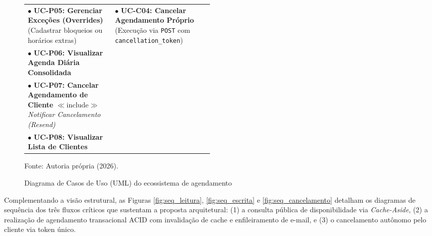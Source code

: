 \documentclass[12pt,a4paper]{article}
\begin{document}
\begin{figure}[hbt]
{\begin{minipage}{0.94\textwidth}
\begin{tabularx}{\linewidth}{@{}p{0.47\linewidth}|X@{}}
$\bullet$ \textbf{UC-P05: Gerenciar Exceções (Overrides)} \newline \hspace*{0.3cm} (Cadastrar bloqueios ou horários extras) & $\bullet$ \textbf{UC-C04: Cancelar Agendamento Próprio} \newline \hspace*{0.3cm} (Execução via \texttt{POST} com \texttt{cancellation\_token}) \\
$\bullet$ \textbf{UC-P06: Visualizar Agenda Diária Consolidada} & \\
$\bullet$ \textbf{UC-P07: Cancelar Agendamento de Cliente} \newline \hspace*{0.3cm} $\ll\text{include}\gg$ \textit{Notificar Cancelamento (Resend)} & \\
$\bullet$ \textbf{UC-P08: Visualizar Lista de Clientes} & \\
\end{tabularx}
\end{minipage}}
\caption{Diagrama de Casos de Uso (UML) do ecossistema de agendamento}
\label{fig:casos_uso}
\vspace{0.1cm}
{\footnotesize Fonte: Autoria própria (2026).}
\end{figure}

Complementando a visão estrutural, as Figuras \ref{fig:seq_leitura}, \ref{fig:seq_escrita} e \ref{fig:seq_cancelamento} detalham os diagramas de sequência dos três fluxos críticos que sustentam a proposta arquitetural: (1) a consulta pública de disponibilidade via \textit{Cache-Aside}, (2) a realização de agendamento transacional ACID com invalidação de cache e enfileiramento de e-mail, e (3) o cancelamento autônomo pelo cliente via token único.
\end{document}
